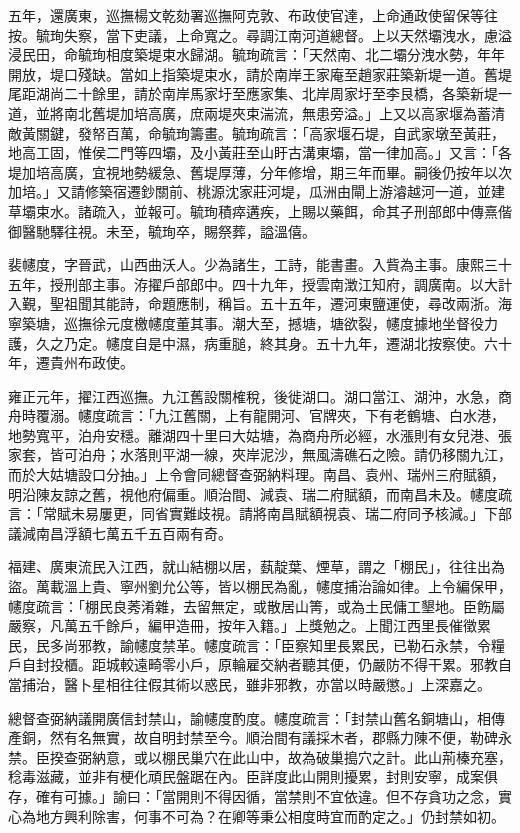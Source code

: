\begin{pinyinscope}
五年，還廣東，巡撫楊文乾劾署巡撫阿克敦、布政使官達，上命通政使留保等往按。毓珣失察，當下吏議，上命寬之。尋調江南河道總督。上以天然壩洩水，慮溢浸民田，命毓珣相度築堤束水歸湖。毓珣疏言：「天然南、北二壩分洩水勢，年年開放，堤口殘缺。當如上指築堤束水，請於南岸王家庵至趙家莊築新堤一道。舊堤尾距湖尚二十餘里，請於南岸馬家圩至應家集、北岸周家圩至李艮橋，各築新堤一道，並將南北舊堤加培高廣，庶兩堤夾束湍流，無患旁溢。」上又以高家堰為蓄清敵黃關鍵，發帑百萬，命毓珣籌畫。毓珣疏言：「高家堰石堤，自武家墩至黃莊，地高工固，惟侯二門等四壩，及小黃莊至山盱古溝東壩，當一律加高。」又言：「各堤加培高廣，宜視地勢緩急、舊堤厚薄，分年修增，期三年而畢。嗣後仍按年以次加培。」又請修築宿遷鈔關前、桃源沈家莊河堤，瓜洲由閘上游濬越河一道，並建草壩束水。諸疏入，並報可。毓珣積瘁遘疾，上賜以藥餌，命其子刑部郎中傳熹偕御醫馳驛往視。未至，毓珣卒，賜祭葬，謚溫僖。

裴幰度，字晉武，山西曲沃人。少為諸生，工詩，能書畫。入貲為主事。康熙三十五年，授刑部主事。洊擢戶部郎中。四十九年，授雲南澂江知府，調廣南。以大計入覲，聖祖聞其能詩，命題應制，稱旨。五十五年，遷河東鹽運使，尋改兩浙。海寧築塘，巡撫徐元度檄幰度董其事。潮大至，撼塘，塘欲裂，幰度據地坐督役力護，久之乃定。幰度自是中濕，病重膇，終其身。五十九年，遷湖北按察使。六十年，遷貴州布政使。

雍正元年，擢江西巡撫。九江舊設關榷稅，後徙湖口。湖口當江、湖沖，水急，商舟時覆溺。幰度疏言：「九江舊關，上有龍開河、官牌夾，下有老鶴塘、白水港，地勢寬平，泊舟安穩。離湖四十里曰大姑塘，為商舟所必經，水漲則有女兒港、張家套，皆可泊舟；水落則平湖一線，夾岸泥沙，無風濤礁石之險。請仍移關九江，而於大姑塘設口分抽。」上令會同總督查弼納料理。南昌、袁州、瑞州三府賦額，明沿陳友諒之舊，視他府偏重。順治間、減袁、瑞二府賦額，而南昌未及。幰度疏言：「常賦未易屢更，同省實難歧視。請將南昌賦額視袁、瑞二府同予核減。」下部議減南昌浮額七萬五千五百兩有奇。

福建、廣東流民入江西，就山結棚以居，蓺靛葉、煙草，謂之「棚民」，往往出為盜。萬載溫上貴、寧州劉允公等，皆以棚民為亂，幰度捕治論如律。上令編保甲，幰度疏言：「棚民良莠淆雜，去留無定，或散居山箐，或為土民傭工墾地。臣飭屬嚴察，凡萬五千餘戶，編甲造冊，按年入籍。」上獎勉之。上聞江西里長催徵累民，民多尚邪教，諭幰度禁革。幰度疏言：「臣察知里長累民，已勒石永禁，令糧戶自封投櫃。距城較遠畸零小戶，原輪雇交納者聽其便，仍嚴防不得干累。邪教自當捕治，醫卜星相往往假其術以惑民，雖非邪教，亦當以時嚴懲。」上深嘉之。

總督查弼納議開廣信封禁山，諭幰度酌度。幰度疏言：「封禁山舊名銅塘山，相傳產銅，然有名無實，故自明封禁至今。順治間有議採木者，郡縣力陳不便，勒碑永禁。臣揆查弼納意，或以棚民巢穴在此山中，故為破巢搗穴之計。此山荊榛充塞，稔毒滋藏，並非有梗化頑民盤踞在內。臣詳度此山開則擾累，封則安寧，成案俱存，確有可據。」諭曰：「當開則不得因循，當禁則不宜依違。但不存貪功之念，實心為地方興利除害，何事不可為？在卿等秉公相度時宜而酌定之。」仍封禁如初。


\end{pinyinscope}
